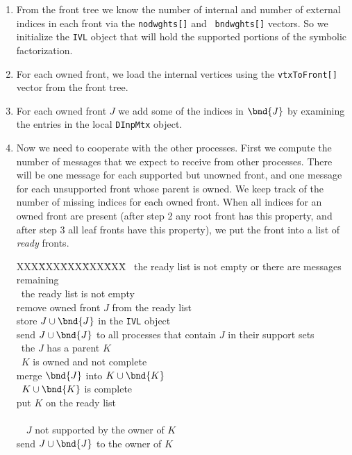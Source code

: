 \begin{enumerate}
\item
From the front tree we know the number of internal and number of
external indices in each front via the {\tt nodwghts[]} and {\tt
bndwghts[]} vectors.
So we initialize the {\tt IVL} object that will hold the supported
portions of the symbolic factorization.
\item
For each owned front, we load the internal vertices using the
{\tt vtxToFront[]} vector from the front tree.
\item
For each owned front $J$ we add some of the indices in $\bnd{J}$ by 
examining the entries in the local {\tt DInpMtx} object.
\item
Now we need to cooperate with the other processes.
First we compute the number of messages that we expect to receive
from other processes.
There will be one message for each supported but unowned front,
and one message for each unsupported front whose parent is owned.
We keep track of the number of missing indices for each owned front.
When all indices for an owned front are present (after step 2
any root front has this property, and after step 3 all leaf fronts
have this property), we put the front into a list of {\it ready}
fronts.
\begin{tabbing}
XXX\=XXX\=XXX\=XXX\=XXX\=\kill
\WHILE\ the ready list is not empty or there are messages remaining \\
\> \WHILE\ the ready list is not empty \\
\>\> remove owned front $J$ from the ready list \\
\>\> store $J \cup \bnd{J}$ in the {\tt IVL} object \\
\>\> send $J \cup \bnd{J}$ to all processes that contain $J$ in
     their support sets \\
\>\> \IF\ the $J$ has a parent $K$ \THEN\ \\
\>\>\> \IF\ $K$ is owned and not complete \THEN\ \\
\>\>\>\> merge $\bnd{J}$ into $K \cup \bnd{K}$ \\
\>\>\>\> \IF\ $K \cup \bnd{K}$ is complete \THEN\ \\
\>\>\>\>\> put $K$ on the ready list \\
\>\>\>\> \END\ \IF \\
\>\>\> \ELSE\ \IF\ $J$ not supported by the owner of $K$ \THEN\ \\
\>\>\>\> send $J \cup \bnd{J}$ to the owner of $K$ \\
\>\>\> \END\ \IF \\

\end{tabbing}
\end{enumerate}
